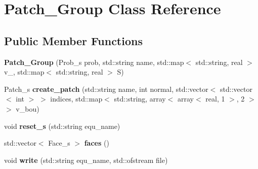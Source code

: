 \hypertarget{classPatch__Group}{\section{Patch\-\_\-\-Group Class Reference}
\label{classPatch__Group}
}
\subsection*{Public Member Functions}
\begin{DoxyCompactItemize}
\item 
\hypertarget{classPatch__Group_a7585b36431136e14c2d17e84388969be}{{\bfseries Patch\-\_\-\-Group} (Prob\-\_\-s prob, std\-::string name, std\-::map$<$ std\-::string, real $>$ v\-\_, std\-::map$<$ std\-::string, real $>$ S)}\label{classPatch__Group_a7585b36431136e14c2d17e84388969be}

\item 
\hypertarget{classPatch__Group_aa5d4a280e09203625d9aadcf41af4c15}{Patch\-\_\-s {\bfseries create\-\_\-patch} (std\-::string name, int normal, std\-::vector$<$ std\-::vector$<$ int $>$ $>$ indices, std\-::map$<$ std\-::string, array$<$ array$<$ real, 1 $>$, 2 $>$ $>$ v\-\_\-bou)}\label{classPatch__Group_aa5d4a280e09203625d9aadcf41af4c15}

\item 
\hypertarget{classPatch__Group_a3472227972d51145bdd0d139920ef64e}{void {\bfseries reset\-\_\-s} (std\-::string equ\-\_\-name)}\label{classPatch__Group_a3472227972d51145bdd0d139920ef64e}

\item 
\hypertarget{classPatch__Group_a326628f83583bb2194f8c82548e9b6b3}{std\-::vector$<$ Face\-\_\-s $>$ {\bfseries faces} ()}\label{classPatch__Group_a326628f83583bb2194f8c82548e9b6b3}

\item 
\hypertarget{classPatch__Group_a98b80a14df82fde1150003b44d3a55cc}{void {\bfseries write} (std\-::string equ\-\_\-name, std\-::ofstream file)}\label{classPatch__Group_a98b80a14df82fde1150003b44d3a55cc}

\end{DoxyCompactItemize}
